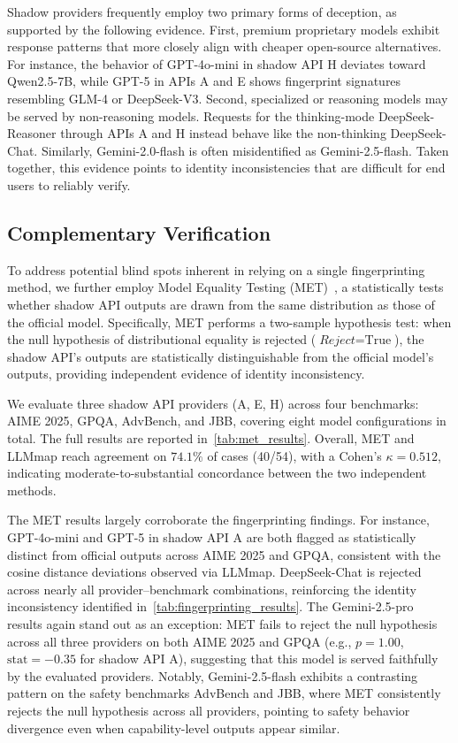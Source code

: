 \documentclass[letterpaper,twocolumn,10pt]{article}
\begin{document}
Shadow providers frequently employ two primary forms of deception, as supported by the following evidence.
First, premium proprietary models exhibit response patterns that more closely align with cheaper open-source alternatives.
For instance, the behavior of GPT-4o-mini in shadow API H deviates toward Qwen2.5-7B, while GPT-5 in APIs A and E shows fingerprint signatures resembling GLM-4 or DeepSeek-V3.
Second, specialized or reasoning models may be served by non-reasoning models.
Requests for the thinking-mode DeepSeek-Reasoner through APIs A and H instead behave like the non-thinking DeepSeek-Chat.
Similarly, Gemini-2.0-flash is often misidentified as Gemini-2.5-flash.
Taken together, this evidence points to identity inconsistencies that are difficult for end users to reliably verify.

\subsection{Complementary Verification}
To address potential blind spots inherent in relying on a single fingerprinting method, we further employ Model Equality Testing (MET)~\cite{GLG24}, a statistically tests whether shadow API outputs are drawn from the same distribution as those of the official model.
Specifically, MET performs a two-sample hypothesis test: when the null hypothesis of distributional equality is rejected ($\textit{Reject} = \text{True}$), the shadow API's outputs are statistically distinguishable from the official model's outputs, providing independent evidence of identity inconsistency.

We evaluate three shadow API providers (A, E, H) across four benchmarks: AIME 2025, GPQA, AdvBench, and JBB, covering eight model configurations in total.
The full results are reported in~\autoref{tab:met_results}.
Overall, MET and LLMmap reach agreement on $74.1\%$ of cases (40/54), with a Cohen's $\kappa = 0.512$, indicating moderate-to-substantial concordance between the two independent methods.

The MET results largely corroborate the fingerprinting findings.
For instance, GPT-4o-mini and GPT-5 in shadow API A are both flagged as statistically distinct from official outputs across AIME 2025 and GPQA, consistent with the cosine distance deviations observed via LLMmap.
DeepSeek-Chat is rejected across nearly all provider--benchmark combinations, reinforcing the identity inconsistency identified in~\autoref{tab:fingerprinting_results}.
The Gemini-2.5-pro results again stand out as an exception: MET fails to reject the null hypothesis across all three providers on both AIME 2025 and GPQA (e.g., $p = 1.00$, $\text{stat} = -0.35$ for shadow API A), suggesting that this model is served faithfully by the evaluated providers.
Notably, Gemini-2.5-flash exhibits a contrasting pattern on the safety benchmarks AdvBench and JBB, where MET consistently rejects the null hypothesis across all providers, pointing to safety behavior divergence even when capability-level outputs appear similar.
\end{document}
